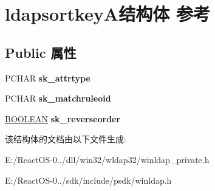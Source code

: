 \hypertarget{structldapsortkey_a}{}\section{ldapsortkey\+A结构体 参考}
\label{structldapsortkey_a}
\subsection*{Public 属性}
\begin{DoxyCompactItemize}
\item 
\mbox{\label{structldapsortkey_a_afc21601bc38637219d912741bcfb6f6c}} 
P\+C\+H\+AR {\bfseries sk\+\_\+attrtype}
\item 
\mbox{\label{structldapsortkey_a_a4b4508e5f523636a927610e300102bdf}} 
P\+C\+H\+AR {\bfseries sk\+\_\+matchruleoid}
\item 
\mbox{\label{structldapsortkey_a_a4ac1f751d54d2673d53b73f698b0e09e}} 
\hyperlink{_processor_bind_8h_a112e3146cb38b6ee95e64d85842e380a}{B\+O\+O\+L\+E\+AN} {\bfseries sk\+\_\+reverseorder}
\end{DoxyCompactItemize}


该结构体的文档由以下文件生成\+:\begin{DoxyCompactItemize}
\item 
E\+:/\+React\+O\+S-\/0../dll/win32/wldap32/winldap\+\_\+private.\+h\item 
E\+:/\+React\+O\+S-\/0../sdk/include/psdk/winldap.\+h\end{DoxyCompactItemize}
